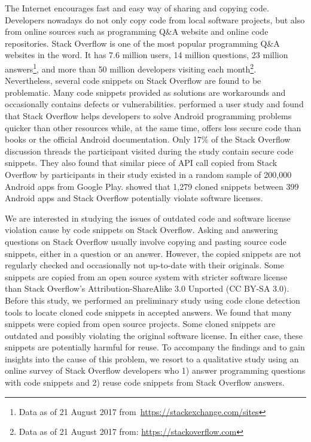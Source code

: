 \documentclass{svjour3}                     %
\begin{document}
The Internet encourages fast and easy way of sharing and copying code.
Developers nowadays do not only copy code from local software projects, but also
from online sources such as programming Q\&A website and online code
repositories. Stack Overflow is one of the most popular programming Q\&A
websites in the word. It has 7.6 million users, 14 million questions, 23 million
answers\footnote{Data as of 21 August 2017
	from~\url{https://stackexchange.com/sites}}, and more than 50 million developers
visiting each month\footnote{Data as of 21 August 2017 from:
	\url{https://stackoverflow.com}}. Nevertheless, several code snippets on Stack
Overflow are found to be problematic. Many code snippets provided as solutions
are workarounds and occasionally contains defects or vulnerabilities.
\cite{Acar2016} performed a user study and found that Stack Overflow helps
developers to solve Android programming problems quicker than other resources
while, at the same time, offers less secure code than books or the official
Android documentation. Only 17\% of the Stack Overflow discussion threads the
participant visited during the study contain secure code snippets. They also
found that similar piece of API call copied from Stack Overflow by participants
in their study existed in a random sample of 200,000 Android apps from Google
Play. \cite{An2017} showed that 1,279 cloned snippets between 399 Android apps
and Stack Overflow potentially violate software licenses.

We are interested in studying the issues of outdated code and software license
violation cause by code snippets on Stack Overflow. Asking and answering
questions on Stack Overflow usually involve copying and pasting source code
snippets, either in a question or an answer. However, the copied snippets are
not regularly checked and occasionally not up-to-date with their originals. Some
snippets are copied from an open source system with stricter software license
than Stack Overflow's Attribution-ShareAlike 3.0 Unported (CC BY-SA 3.0). Before
this study, we performed an preliminary study using code clone detection tools
to locate cloned code snippets in accepted answers. We found that many snippets
were copied from open source projects. Some cloned snippets are outdated and
possibly violating the original software license. In either case, these snippets
are potentially harmful for reuse. To accompany the findings and to gain
insights into the cause of this problem, we resort to a qualitative study using
an online survey of Stack Overflow developers who 1) answer programming
questions with code snippets and 2) reuse code snippets from Stack Overflow
answers. 
\end{document}
